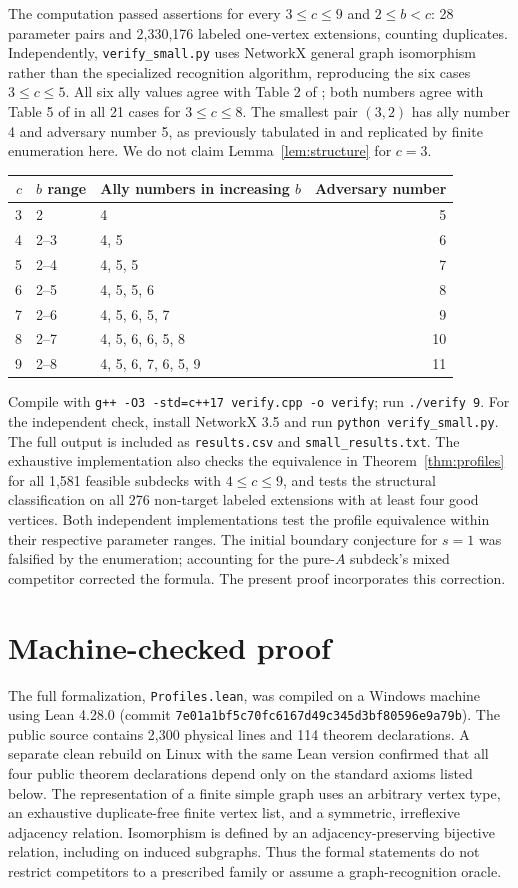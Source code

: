 \documentclass[11pt]{article}
\begin{document}
The computation passed assertions for every $3\leq c\leq9$ and $2\leq b<c$: 28 parameter pairs and 2,330,176 labeled one-vertex extensions, counting duplicates. Independently, \texttt{verify\_small.py} uses NetworkX general graph isomorphism rather than the specialized recognition algorithm, reproducing the six cases $3\leq c\leq5$. All six ally values agree with Table 2 of \cite{MR}; both numbers agree with Table 5 of \cite{RR} in all 21 cases for $3\leq c\leq8$. The smallest pair $(3,2)$ has ally number 4 and adversary number 5, as previously tabulated in \cite{RR} and replicated by finite enumeration here. We do not claim Lemma~\ref{lem:structure} for $c=3$.
\begin{center}
\begin{tabular}{rllr}
\toprule
$c$ & $b$ range & Ally numbers in increasing $b$ & Adversary number\\
\midrule
3 & 2 & 4 & 5\\
4 & 2--3 & 4, 5 & 6\\
5 & 2--4 & 4, 5, 5 & 7\\
6 & 2--5 & 4, 5, 5, 6 & 8\\
7 & 2--6 & 4, 5, 6, 5, 7 & 9\\
8 & 2--7 & 4, 5, 6, 6, 5, 8 & 10\\
9 & 2--8 & 4, 5, 6, 7, 6, 5, 9 & 11\\
\bottomrule
\end{tabular}
\end{center}
Compile with \texttt{g++ -O3 -std=c++17 verify.cpp -o verify}; run \texttt{./verify 9}. For the independent check, install NetworkX 3.5 and run \texttt{python verify\_small.py}. The full output is included as \texttt{results.csv} and \texttt{small\_results.txt}. The exhaustive implementation also checks the equivalence in Theorem~\ref{thm:profiles} for all 1,581 feasible subdecks with $4\leq c\leq9$, and tests the structural classification on all 276 non-target labeled extensions with at least four good vertices. Both independent implementations test the profile equivalence within their respective parameter ranges. The initial boundary conjecture for $s=1$ was falsified by the enumeration; accounting for the pure-$A$ subdeck's mixed competitor corrected the formula. The present proof incorporates this correction.
\section{Machine-checked proof}
The full formalization, \texttt{Profiles.lean}, was compiled on a Windows machine using Lean 4.28.0 (commit \texttt{7e01a1bf5c70fc6167d49c345d3bf80596e9a79b}). The public source contains 2,300 physical lines and 114 theorem declarations. A separate clean rebuild on Linux with the same Lean version confirmed that all four public theorem declarations depend only on the standard axioms listed below. The representation of a finite simple graph uses an arbitrary vertex type, an exhaustive duplicate-free finite vertex list, and a symmetric, irreflexive adjacency relation. Isomorphism is defined by an adjacency-preserving bijective relation, including on induced subgraphs. Thus the formal statements do not restrict competitors to a prescribed family or assume a graph-recognition oracle.
\end{document}
